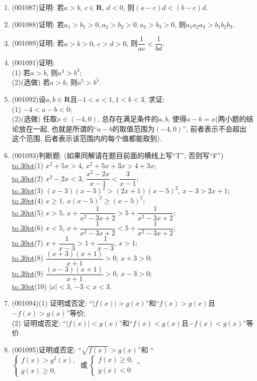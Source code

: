\documentclass[10pt,a4paper]{article}
\newcommand{\blank}[1]{\underline{\hbox to #1pt{}}}
\begin{document}
\begin{enumerate}[1.]
\blank{40}$>$\blank{40}$>$\blank{40}$>$\blank{40}.
\item {\tiny (001087)}证明: 若$a>b$, $c\in\mathbf{R}$, $d<0$, 则$(a-c)d<(b-c)d$.
\item {\tiny (001088)}证明: 若$a_1>b_1>0,a_2>b_2>0,a_3>b_3>0$, 则$a_1a_2a_3>b_1b_2b_3$.
\item {\tiny (001089)}证明: 若$a>b>0$, $c>d>0$, 则$\dfrac{1}{ac}<\dfrac{1}{bd}$.
\item {\tiny (001091)}证明:\\ 
(1) 若$a>b$, 则$a^3>b^3$;\\ 
(2)(选做) 若$a>b$, 则$a^5>b^5$.
\item {\tiny (001092)}设$a,b\in\mathbf{R}$且$-1<a<1,1<b<3$, 求证:\\ 
(1) $-4<a-b<0$;\\ 
(2)(选做) 任取$x\in(-4,0)$, 总存在满足条件的$a,b$, 使得$a-b=x$(两小题的结论放在一起, 也就是所谓的``$a-b$的取值范围为$(-4,0)$'', 前者表示不会超出这个范围, 后者表示该范围内的每个值都能取到).
\item {\tiny (001093)}判断题: (如果同解请在题目前面的横线上写``T'', 否则写``F'')\\ 
\blank{30}(1) $x^2+5x>4$, $x^2+5x+3x>4+3x$;\\ 
\blank{30}(2) $x^2-2x<3$, $\dfrac{x^2-2x}{x-1}<\dfrac{3}{x-1}$;\\ 
\blank{30}(3) $(x-3)(x-5)^2>(2x+1)(x-5)^2$, $x-3>2x+1$;\\ 
\blank{30}(4) $x\ge 1$, $x(x-5)^2\ge (x-5)^2$;\\ 
\blank{30}(5) $x>5$, $x+\dfrac{1}{x^2-3x+2}> 5+\dfrac{1}{x^2-3x+2}$;\\ 
\blank{30}(6) $x<5$, $x+\dfrac{1}{x^2-3x+2}< 5+\dfrac{1}{x^2-3x+2}$;\\ 
\blank{30}(7) $x+\dfrac{1}{x-3}>1+\dfrac{1}{x-3}$, $x>1$;\\ 
\blank{30}(8) $\dfrac{(x+3)(x+1)}{x+1}>0$, $x+3>0$;\\ 
\blank{30}(9) $\dfrac{(x-3)(x+1)}{x+1}>0$, $x-3>0$;\\ 
\blank{30}(10) $|x|<3$, $-3<x<3$.
\item {\tiny (001094)}(1) 证明或否定: ``$|f(x)|>g(x)$''和``$f(x)>g(x)$且$-f(x)>g(x)$''等价;\\ 
(2) 证明或否定: ``$|f(x)|<g(x)$''和``$f(x)<g(x)$且$-f(x)<g(x)$''等价.
\item {\tiny (001095)}证明或否定: ``$\sqrt{f(x)}>g(x)$''和
``$\left\{\begin{array}{l}f(x)>g^2(x),\\g(x)\ge 0,\end{array}\right.\ \text{或} \ \left\{\begin{array}{l}f(x)\ge 0,\\g(x)<0\end{array}\right.$''

\end{enumerate}
\end{document}
